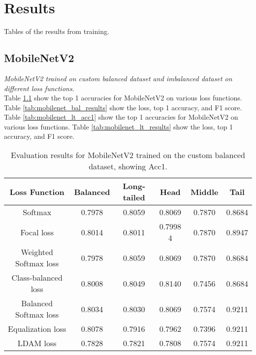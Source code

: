 \chapter{Results} %
\label{app:A}
Tables of the results from training.


\section{MobileNetV2}
\textit{MobileNetV2 trained on custom balanced dataset and imbalanced dataset on different loss functions.}\\

Table \ref{tab:mobilenet_bal_acc1} show the top 1 accuracies for MobileNetV2 on various loss functions. Table \ref{tab:mobilenet_bal_results} show the loss, top 1 accuracy, and F1 score.\\
Table \ref{tab:mobilenet_lt_acc1} show the top 1 accuracies for MobileNetV2 on various loss functions. Table \ref{tab:mobilenet_lt_results} show the loss, top 1 accuracy, and F1 score. 

\begin{table}[H]
    \centering
    \begin{tabular}{cccccc}
        \toprule
        Loss Function & Balanced & Long-tailed & Head & Middle & Tail \\ 
        \midrule
        Softmax   & 0.7978   & 0.8059 & 0.8069 & 0.7870 & 0.8684 \\
        Focal loss   & 0.8014   & 0.8011 & 0.7998 4 & 0.7870 & 0.8947 \\
        Weighted Softmax loss   & 0.7978   & 0.8059 & 0.8069 & 0.7870 & 0.8684 \\
        Class-balanced loss   & 0.8008   & 0.8049 & 0.8140 & 0.7456 & 0.8684 \\
        Balanced Softmax loss   & 0.8034  & 0.8030 & 0.8069 & 0.7574 & 0.9211 \\
        Equalization loss   &  0.8078  & 0.7916 & 0.7962 & 0.7396 & 0.9211 \\
        LDAM loss   &  0.7828   & 0.7821 & 0.7808 & 0.7574 & 0.9211 \\
        \bottomrule
    \end{tabular}
    \caption{Evaluation results for MobileNetV2 trained on the custom balanced dataset, showing Acc1.}
    \label{tab:mobilenet_bal_acc1}
\end{table}

